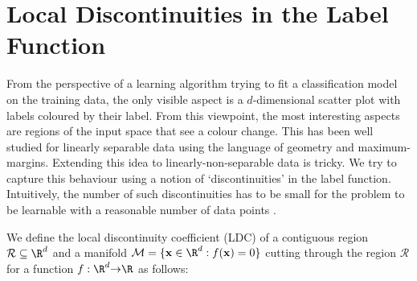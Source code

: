 \documentclass{article} %
\renewcommand{\>}{{\rightarrow}}
\renewcommand{\=}{\stackrel{\triangle}{=}}
\newcommand{\0}{{\mathbf 0}}
\newcommand{\cM}{{\mathcal M}}
\newcommand{\cR}{{\mathcal R}}
\newcommand{\x}{{\mathbf x}}
\begin{document}

\section{Local Discontinuities in the Label Function}

\label{sec:discont}

From the perspective of a learning algorithm trying to fit a classification model on the training data, the only visible aspect is a $d$-dimensional scatter plot with labels coloured by their label. From this viewpoint, the most interesting aspects are regions of the input space that see a colour change. This has been well studied for linearly separable data using the language of geometry and maximum-margins. Extending this idea to linearly-non-separable data is tricky. We try to capture this behaviour using a notion of `discontinuities' in the label function. Intuitively, the number of such discontinuities has to be small for the problem to be learnable with a reasonable number of data points \citep{klivans2008learning}. 

We define the local discontinuity coefficient (LDC) of a contiguous region $\cR \subseteq \R^d$ and a manifold $\cM = \{\x \in \R^d : f(\x)=0\}$ cutting through the region $\cR$ for a function $f:\R^d \> \R$ as follows:

\end{document}

